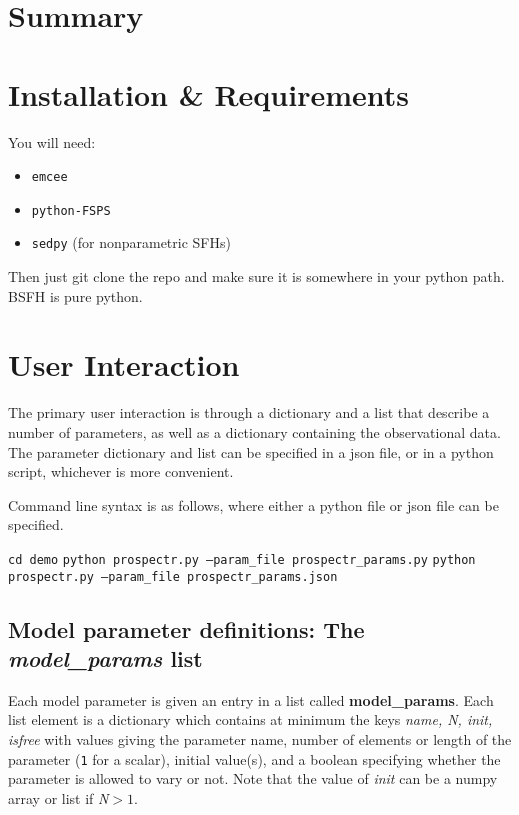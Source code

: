 

\section{Summary}

\section{Installation \& Requirements}
You will need:

\begin{itemize}
\item \texttt{emcee}
\item \texttt{python-FSPS}
\item \texttt{sedpy} (for nonparametric SFHs)
\end{itemize}

Then just git clone the repo and make sure it is somewhere in your
python path.  BSFH is pure python.

\section{User Interaction}
The primary user interaction is through a dictionary and a list that
describe a number of parameters, as well as a dictionary containing
the observational data.  The parameter dictionary and list can be
specified in a json file, or in a python script, whichever is more
convenient.

Command line syntax is as follows, where either a python file or json
file can be specified.
\begin{center}
\texttt{cd demo}
\texttt{python prospectr.py --param_file prospectr_params.py}
\texttt{python prospectr.py --param_file prospectr_params.json}
\end{center}

\subsection{Model parameter definitions: The \emph{model_params} list}
Each model parameter is given an entry in a list called {\bf
model_params}. Each list element is a dictionary which contains at
minimum the keys {\it name, N, init, isfree} with values giving the
parameter name, number of elements or length of the parameter
(\texttt{1} for a scalar), initial value(s), and a boolean specifying
whether the parameter is allowed to vary or not.  Note that the value
of {\it init} can be a numpy array or list if {\it N}$>1$.

